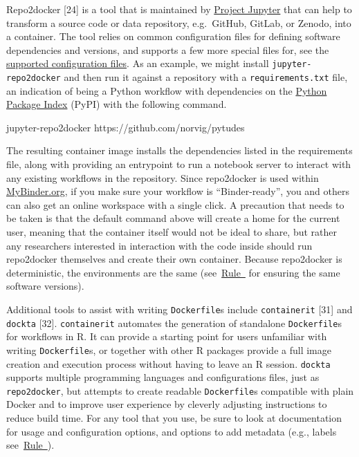 \documentclass[10pt,letterpaper]{article}
\newenvironment{Shaded}{\begin{snugshade}}{\end{snugshade}}
\newcommand{\ExtensionTok}[1]{#1}
\newcommand{\NormalTok}[1]{#1}
\begin{document}
Repo2docker {[}24{]} is a tool that is maintained by
\href{https://jupyter.org/}{Project Jupyter} that can help to transform
a source code or data repository, e.g.~GitHub, GitLab, or Zenodo, into a
container. The tool relies on common configuration files for defining
software dependencies and versions, and supports a few more special
files for, see the
\href{https://repo2docker.readthedocs.io/en/latest/config_files.html}{supported
configuration files}. As an example, we might install
\texttt{jupyter-repo2docker} and then run it against a repository with a
\texttt{requirements.txt} file, an indication of being a Python workflow
with dependencies on the \href{https://pypi.org/}{Python Package Index}
(PyPI) with the following command.

\begin{Shaded}
\begin{Highlighting}[]
\ExtensionTok{jupyter-repo2docker}\NormalTok{ https://github.com/norvig/pytudes}
\end{Highlighting}
\end{Shaded}

The resulting container image installs the dependencies listed in the
requirements file, along with providing an entrypoint to run a notebook
server to interact with any existing workflows in the repository. Since
repo2docker is used within \href{https://mybinder.org/}{MyBinder.org},
if you make sure your workflow is ``Binder-ready'', you and others can
also get an online workspace with a single click. A precaution that
needs to be taken is that the default command above will create a home
for the current user, meaning that the container itself would not be
ideal to share, but rather any researchers interested in interaction
with the code inside should run repo2docker themselves and create their
own container. Because repo2docker is deterministic, the environments
are the same
(see~\hyperref[{rule:pinning}]{Rule~} for
ensuring the same software versions).

Additional tools to assist with writing \texttt{Dockerfile}s include
\texttt{containerit} {[}31{]} and \texttt{dockta} {[}32{]}.
\texttt{containerit} automates the generation of standalone
\texttt{Dockerfile}s for workflows in R. It can provide a starting point
for users unfamiliar with writing \texttt{Dockerfile}s, or together with
other R packages provide a full image creation and execution process
without having to leave an R session. \texttt{dockta} supports multiple
programming languages and configurations files, just as
\texttt{repo2docker}, but attempts to create readable
\texttt{Dockerfile}s compatible with plain Docker and to improve user
experience by cleverly adjusting instructions to reduce build time. For
any tool that you use, be sure to look at documentation for usage and
configuration options, and options to add metadata (e.g., labels
see~\hyperref[{rule:document}]{Rule~}).
\end{document}
